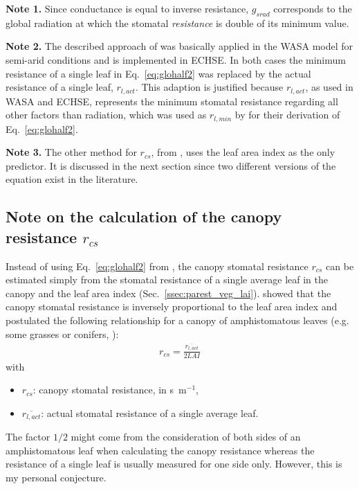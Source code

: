 \documentclass{scrreprt}
\newenvironment{denseitem}{
  \begin{itemize}
    \setlength{\itemsep}{0pt}
    \setlength{\parskip}{0pt}
    \setlength{\parsep}{0pt}
}{
  \end{itemize}
}
\begin{document}
\textbf{Note 1.}
Since conductance is equal to inverse resistance, $g_{srad}$ corresponds to the global radiation at which the stomatal \emph{resistance} is double of its minimum value.

\textbf{Note 2.}
The described approach of \citet{saugier91} was basically applied in the WASA model for semi-arid conditions \citep{guentner02} and is implemented in ECHSE.
In both cases the minimum resistance of a single leaf in Eq.~\eqref{eq:glohalf2} was replaced by the actual resistance of a single leaf, $r_{l,act}$.
This adaption is justified because $r_{l,act}$, as used in WASA and ECHSE, represents the minimum stomatal resistance regarding all other factors than radiation, which was used as $r_{l,min}$ by \citet{saugier91} for their derivation of Eq.~\eqref{eq:glohalf2}.

\textbf{Note 3.}
The other method for $r_{cs}$, from \citet{shuttleworth85}, uses the leaf area index as the only predictor.
It is discussed in the next section since two different versions of the equation exist in the literature.

\subsection{Note on the calculation of the canopy resistance $r_{cs}$} \label{ssec:parest_veg_notercs}

Instead of using Eq.~\eqref{eq:glohalf2} from \citet{saugier91}, the canopy stomatal resistance $r_{cs}$ can be estimated simply from the stomatal resistance of a single average leaf in the canopy and the leaf area index (Sec.~\ref{ssec:parest_veg_lai}).
\citet{shuttleworth76} showed that the canopy stomatal resistance is inversely proportional to the leaf area index and postulated the following relationship for a canopy of amphistomatous leaves (e.g. some grasses or conifers, \citealt{shuttleworth85}):
\begin{align} \label{eq:notercs1}
  r_{cs} = \frac{\overline{r_{l,act}}}{2 LAI}
\end{align}
%
with
\begin{denseitem}
  \item[] $r_{cs}$: canopy stomatal resistance, in s~m$^{-1}$,
  \item[] $\overline{r_{l,act}}$: actual stomatal resistance of a single average leaf.
\end{denseitem}
%
The factor $1/2$ might come from the consideration of both sides of an amphistomatous leaf when calculating the canopy resistance whereas the resistance of a single leaf is usually measured for one side only.
However, this is my personal conjecture.
\end{document}

